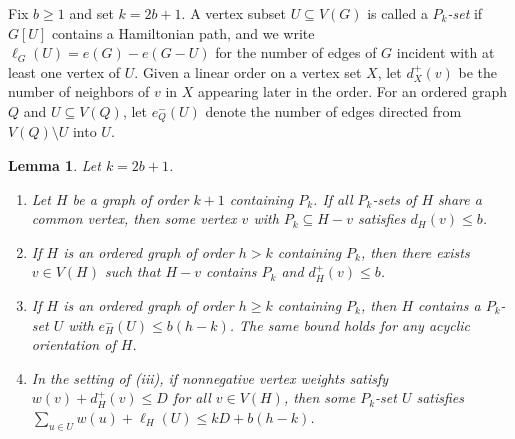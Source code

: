 \documentclass[10pt]{article}
\theoremstyle{compactplain}
\newtheorem{lemma}[theorem]{Lemma}
\theoremstyle{remark}\newtheorem{remark}[theorem]{Remark}
\begin{document}
Fix $b\ge1$ and set $k=2b+1$. A vertex subset $U\subseteq V(G)$ is
called a \emph{$P_k$-set} if $G[U]$ contains a Hamiltonian path, and we
write $\ell_G(U)=e(G)-e(G-U)$ for the number of edges of $G$ incident
with at least one vertex of $U$. Given a linear order on a vertex set
$X$, let $d_X^+(v)$ be the number of neighbors of $v$ in $X$ appearing
later in the order. For an ordered graph $Q$ and $U\subseteq V(Q)$, let
$e_Q^-(U)$ denote the number of edges directed from $V(Q)\setminus U$
into $U$.

\begin{lemma}\label{lem:ordered-deletion}
Let $k=2b+1$.
\begin{enumerate}
\item[(i)] Let $H$ be a graph of order $k+1$ containing $P_k$. If all
$P_k$-sets of $H$ share a common vertex, then some vertex $v$ with
$P_k\subseteq H-v$ satisfies $d_H(v)\le b$.
\item[(ii)] If $H$ is an ordered graph of order $h>k$ containing $P_k$,
then there exists $v\in V(H)$ such that $H-v$ contains $P_k$ and
$d_H^+(v)\le b$.
\item[(iii)] If $H$ is an ordered graph of order $h\ge k$ containing
$P_k$, then $H$ contains a $P_k$-set $U$ with $e_H^-(U)\le b(h-k)$. The
same bound holds for any acyclic orientation of $H$.
\item[(iv)] In the setting of (iii), if nonnegative vertex weights
satisfy $w(v)+d_H^+(v)\le D$ for all $v\in V(H)$, then some $P_k$-set
$U$ satisfies $\sum_{u\in U}w(u)+\ell_H(U)\le kD+b(h-k)$.
\end{enumerate}
\end{lemma}
\end{document}
